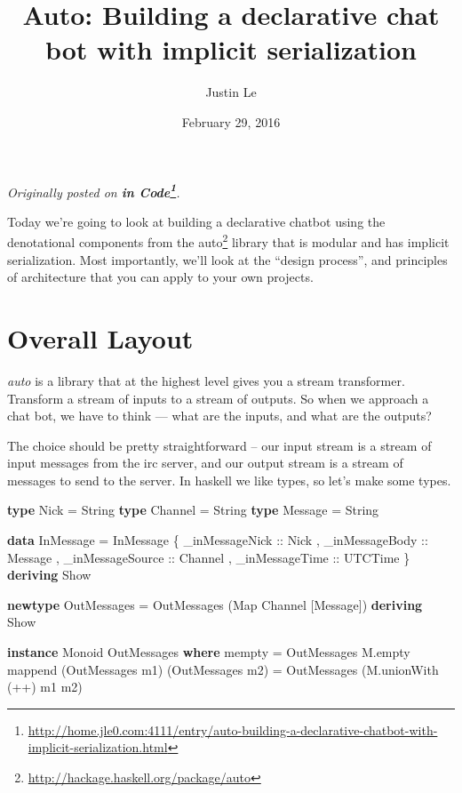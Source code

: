\documentclass[]{article}
\title{Auto: Building a declarative chat bot with implicit serialization}
\author{Justin Le}
\date{February 29, 2016}
\newenvironment{Shaded}{}{}
\newcommand{\KeywordTok}[1]{\textcolor[rgb]{0.00,0.44,0.13}{\textbf{{#1}}}}
\newcommand{\DataTypeTok}[1]{\textcolor[rgb]{0.56,0.13,0.00}{{#1}}}
\newcommand{\OtherTok}[1]{\textcolor[rgb]{0.00,0.44,0.13}{{#1}}}
\newcommand{\FunctionTok}[1]{\textcolor[rgb]{0.02,0.16,0.49}{{#1}}}
\newcommand{\NormalTok}[1]{{#1}}
\renewcommand{\href}[2]{#2\footnote{\url{#1}}}
\begin{document}
\maketitle

\emph{Originally posted on
\textbf{\href{http://home.jle0.com:4111/entry/auto-building-a-declarative-chatbot-with-implicit-serialization.html}{in
Code}}.}

Today we're going to look at building a declarative chatbot using the
denotational components from the
\href{http://hackage.haskell.org/package/auto}{auto} library that is
modular and has implicit serialization. Most importantly, we'll look at
the ``design process'', and principles of architecture that you can
apply to your own projects.

\section{Overall Layout}\label{overall-layout}

\emph{auto} is a library that at the highest level gives you a stream
transformer. Transform a stream of inputs to a stream of outputs. So
when we approach a chat bot, we have to think --- what are the inputs,
and what are the outputs?

The choice should be pretty straightforward -- our input stream is a
stream of input messages from the irc server, and our output stream is a
stream of messages to send to the server. In haskell we like types, so
let's make some types.

\begin{Shaded}
\begin{Highlighting}[]
\KeywordTok{type} \DataTypeTok{Nick}    \FunctionTok{=} \DataTypeTok{String}
\KeywordTok{type} \DataTypeTok{Channel} \FunctionTok{=} \DataTypeTok{String}
\KeywordTok{type} \DataTypeTok{Message} \FunctionTok{=} \DataTypeTok{String}

\KeywordTok{data} \DataTypeTok{InMessage} \FunctionTok{=} \DataTypeTok{InMessage} \NormalTok{\{ _}\OtherTok{inMessageNick   ::} \DataTypeTok{Nick}
                           \NormalTok{, _}\OtherTok{inMessageBody   ::} \DataTypeTok{Message}
                           \NormalTok{, _}\OtherTok{inMessageSource ::} \DataTypeTok{Channel}
                           \NormalTok{, _}\OtherTok{inMessageTime   ::} \DataTypeTok{UTCTime}
                           \NormalTok{\} }\KeywordTok{deriving} \DataTypeTok{Show}

\KeywordTok{newtype} \DataTypeTok{OutMessages} \FunctionTok{=} \DataTypeTok{OutMessages} \NormalTok{(}\DataTypeTok{Map} \DataTypeTok{Channel} \NormalTok{[}\DataTypeTok{Message}\NormalTok{]) }\KeywordTok{deriving} \DataTypeTok{Show}

\KeywordTok{instance} \DataTypeTok{Monoid} \DataTypeTok{OutMessages} \KeywordTok{where}
    \NormalTok{mempty  }\FunctionTok{=} \DataTypeTok{OutMessages} \NormalTok{M.empty}
    \NormalTok{mappend (}\DataTypeTok{OutMessages} \NormalTok{m1) (}\DataTypeTok{OutMessages} \NormalTok{m2)}
            \FunctionTok{=} \DataTypeTok{OutMessages} \NormalTok{(M.unionWith (}\FunctionTok{++}\NormalTok{) m1 m2)}
\end{Highlighting}
\end{Shaded}
\end{document}
